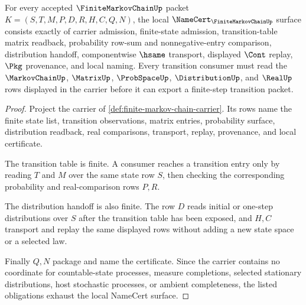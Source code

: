 \begin{theorem}
\label{thm:finite-markov-chain-namecert-obligations}
For every accepted $\FiniteMarkovChainUp$ packet
$K=(S,T,M,P,D,R,H,C,Q,N)$, the local
$\NameCert_{\FiniteMarkovChainUp}$ surface consists exactly of carrier
admission, finite-state admission, transition-table matrix readback,
probability row-sum and nonnegative-entry comparison, distribution handoff,
componentwise $\hsame$ transport, displayed $\Cont$ replay, $\Pkg$ provenance,
and local naming. Every transition consumer must read the $\MarkovChainUp$,
$\MatrixUp$, $\ProbSpaceUp$, $\DistributionUp$, and $\RealUp$ rows displayed in
the carrier before it can export a finite-step transition packet.
\end{theorem}
\begin{proof}
Project the carrier of \autoref{def:finite-markov-chain-carrier}. Its rows
name the finite state list, transition observations, matrix entries,
probability surface, distribution readback, real comparisons, transport,
replay, provenance, and local certificate.

The transition table is finite. A consumer reaches a transition entry only by
reading $T$ and $M$ over the same state row $S$, then checking the corresponding
probability and real-comparison rows $P,R$.

The distribution handoff is also finite. The row $D$ reads initial or one-step
distributions over $S$ after the transition table has been exposed, and $H,C$
transport and replay the same displayed rows without adding a new state space
or a selected law.

Finally $Q,N$ package and name the certificate. Since the carrier contains no
coordinate for countable-state processes, measure completions, selected
stationary distributions, host stochastic processes, or ambient completeness,
the listed obligations exhaust the local NameCert surface.
\end{proof}



